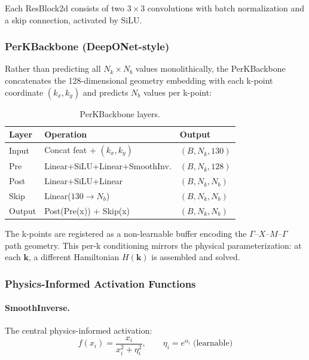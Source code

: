 \documentclass[11pt]{article}
\begin{document}
Each ResBlock2d consists of two $3{\times}3$ convolutions with batch normalization and a skip connection, activated by SiLU.

\subsubsection{PerKBackbone (DeepONet-style)}

Rather than predicting all $N_k \times N_b$ values monolithically, the PerKBackbone concatenates the 128-dimensional geometry embedding with each k-point coordinate $(k_x, k_y)$ and predicts $N_b$ values per k-point:

\begin{table}[H]
    \centering
    \caption{PerKBackbone layers.}
    \label{tab:backbone}
    \begin{tabular}{@{}lll@{}}
        \toprule
        \textbf{Layer} & \textbf{Operation} & \textbf{Output} \\
        \midrule
        Input & Concat feat + $(k_x, k_y)$ & $(B, N_k, 130)$ \\
        Pre   & Linear+SiLU+Linear+SmoothInv. & $(B, N_k, 128)$ \\
        Post  & Linear+SiLU+Linear & $(B, N_k, N_b)$ \\
        Skip  & Linear($130 \to N_b$) & $(B, N_k, N_b)$ \\
        Output & Post(Pre(x)) + Skip(x) & $(B, N_k, N_b)$ \\
        \bottomrule
    \end{tabular}
\end{table}

The k-points are registered as a non-learnable buffer encoding the $\Gamma$--$X$--$M$--$\Gamma$ path geometry. This per-k conditioning mirrors the physical parameterization: at each $\mathbf{k}$, a different Hamiltonian $H(\mathbf{k})$ is assembled and solved.

\subsubsection{Physics-Informed Activation Functions}

\paragraph{SmoothInverse.} The central physics-informed activation:
\begin{equation}
    f(x_i) = \frac{x_i}{x_i^2 + \eta_i^2}, \qquad \eta_i = e^{\alpha_i} \;\text{(learnable)}
    \label{eq:smooth_inv}
\end{equation}
\end{document}
